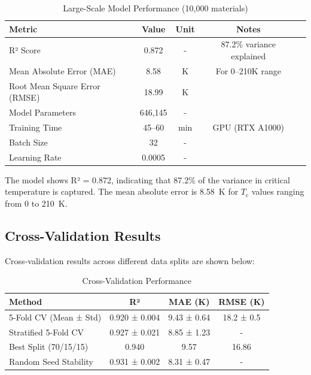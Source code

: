 \documentclass[11pt,a4paper]{article}
\begin{document}
\begin{table}[H]
\centering
\caption{Large-Scale Model Performance (10,000 materials)}
\begin{tabular}{@{}lcccc@{}}
\toprule
\textbf{Metric} & \textbf{Value} & \textbf{Unit} & \textbf{Notes} \\
\midrule
R² Score & 0.872 & - & 87.2\% variance explained \\
Mean Absolute Error (MAE) & 8.58 & \si{\kelvin} & For 0--210K range \\
Root Mean Square Error (RMSE) & 18.99 & \si{\kelvin} & \\
Model Parameters & 646,145 & - & \\
Training Time & 45--60 & \si{\minute} & GPU (RTX A1000) \\
Batch Size & 32 & - & \\
Learning Rate & 0.0005 & - & \\
\bottomrule
\end{tabular}
\end{table}

The model shows R² = 0.872, indicating that 87.2\% of the variance in critical temperature is captured. The mean absolute error is \SI{8.58}{\kelvin} for $T_{\text{c}}$ values ranging from 0 to \SI{210}{\kelvin}.

\subsection{Cross-Validation Results}

Cross-validation results across different data splits are shown below:

\begin{table}[H]
\centering
\caption{Cross-Validation Performance}
\begin{tabular}{@{}lccc@{}}
\toprule
\textbf{Method} & \textbf{R²} & \textbf{MAE (\si{\kelvin})} & \textbf{RMSE (\si{\kelvin})} \\
\midrule
5-Fold CV (Mean ± Std) & \num{0.920} ± \num{0.004} & \num{9.43} ± \num{0.64} & \num{18.2} ± \num{0.5} \\
Stratified 5-Fold CV & \num{0.927} ± \num{0.021} & \num{8.85} ± \num{1.23} & - \\
Best Split (70/15/15) & 0.940 & 9.57 & 16.86 \\
Random Seed Stability & \num{0.931} ± \num{0.002} & \num{8.31} ± \num{0.47} & - \\
\bottomrule
\end{tabular}
\end{table}
\end{document}
